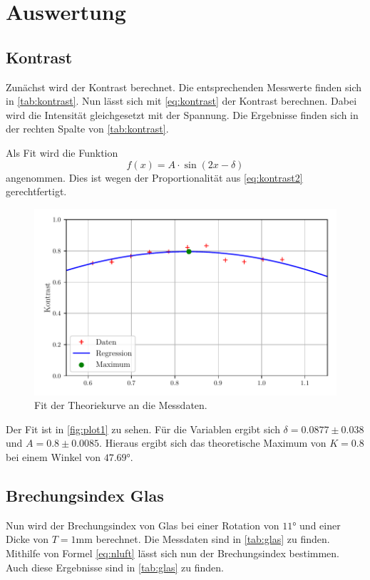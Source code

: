 \section{Auswertung}
\label{sec:Auswertung}

\subsection{Kontrast}
Zunächst wird der Kontrast berechnet.
Die entsprechenden Messwerte finden sich in \autoref{tab:kontrast}.
Nun lässt sich mit \autoref{eq:kontrast} der Kontrast berechnen. 
Dabei wird die Intensität gleichgesetzt mit der Spannung.
Die Ergebnisse finden sich in der rechten Spalte von \autoref{tab:kontrast}.

Als Fit wird die Funktion 
\begin{equation*}
    f(x) = A \cdot \sin(2 x - \delta)
\end{equation*}
angenommen. Dies ist wegen der Proportionalität aus \autoref{eq:kontrast2} gerechtfertigt.
\begin{figure}
    \centering
    \includegraphics[width = 0.7 \linewidth]{build/Kontrast.pdf}
    \caption{Fit der Theoriekurve an die Messdaten.}
    \label{fig:plot1}
\end{figure}
Der Fit ist in \autoref{fig:plot1} zu sehen.
Für die Variablen ergibt sich $\delta = 0.0877 \pm 0.038$ und $A = 0.8 \pm 0.0085$.
Hieraus ergibt sich das theoretische Maximum von $K = 0.8$ bei einem Winkel von $47.69°$.

\subsection{Brechungsindex Glas}
Nun wird der Brechungsindex von Glas bei einer Rotation von $11°$ und einer Dicke von $T = 1 \unit{\milli\meter}$ berechnet.
Die Messdaten sind in \autoref{tab:glas} zu finden.
Mithilfe von Formel \autoref{eq:nluft} lässt sich nun der Brechungsindex bestimmen.
Auch diese Ergebnisse sind in \autoref{tab:glas} zu finden.



